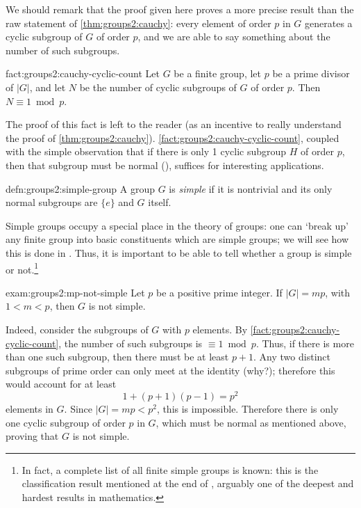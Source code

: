 We should remark that the proof given here proves a more precise
result than the raw statement of \cref{thm:groups2:cauchy}: every
element of order $p$ in $G$ generates a cyclic subgroup of $G$ of
order $p$, and we are able to say something about the number of such
subgroups.
\begin{fact}{}{fact:groups2:cauchy-cyclic-count}
  Let $G$ be a finite group, let $p$ be a prime divisor of $|G|$, and
  let $N$ be the number of cyclic subgroups of $G$ of order $p$. Then
  $N \equiv 1 \bmod p$.
\end{fact}

The proof of this fact is left to the reader (as an incentive to
really understand the proof of \cref{thm:groups2:cauchy}).
\cref{fact:groups2:cauchy-cyclic-count}, coupled with the simple
observation that if there is only 1 cyclic subgroup $H$ of order $p$,
then that subgroup must be normal
(), suffices for
interesting applications.

\begin{defn}{}{defn:groups2:simple-group}
  A group $G$ is \emph{simple} if it is nontrivial and its only normal
  subgroups are $\{e\}$ and $G$ itself.
\end{defn}
Simple groups occupy a special place in the theory of groups: one can
`break up' any finite group into basic constituents which are simple
groups; we will see how this is done in
. Thus, it is
important to be able to tell whether a group is simple or
not.\footnote{In fact, a complete list of all finite simple groups is
  known: this is the classification result mentioned at the end of
  ,
  arguably one of the deepest and hardest results in mathematics.}
\begin{exam}{}{exam:groups2:mp-not-simple}
  Let $p$ be a positive prime integer. If $|G| = mp$, with
  $1 < m < p$, then $G$ is not simple.

  Indeed, consider the subgroups of $G$ with $p$ elements. By
  \cref{fact:groups2:cauchy-cyclic-count}, the number of such
  subgroups is $\equiv 1 \bmod p$. Thus, if there is more than one
  such subgroup, then there must be at least $p + 1$. Any two distinct
  subgroups of prime order can only meet at the identity (why?);
  therefore this would account for at least
  \[
    1 + (p+1)(p-1) = p^2
  \]
  elements in $G$. Since $|G| = mp < p^2$, this is
  impossible. Therefore there is only one cyclic subgroup of order $p$
  in $G$, which must be normal as mentioned above, proving that $G$ is
  not simple.
\end{exam}

